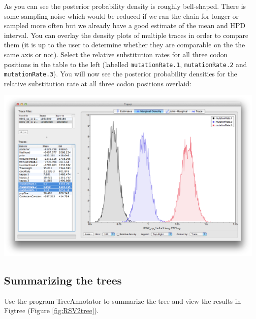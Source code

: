 \documentclass[12pt]{article}
\begin{document}
\medskip{}

As you can see the posterior probability density is roughly bell-shaped. There is some sampling noise which would be
reduced if we ran the chain for longer or sampled more often but we already have a good estimate of the mean and HPD interval. You can overlay
the density plots of multiple traces in order to compare them (it is up to the user to determine whether they are comparable on the the same axis or not). Select the relative substitution rates for all three codon positions in the table to the left (labelled
\texttt{mutationRate.1}, \texttt{mutationRate.2} and \texttt{mutationRate.3}). You will now see the posterior probability densities for the relative
substitution rate at all three codon positions overlaid:

\medskip{}

\includegraphics[width=\textwidth]{figures/Tracer_relativeRates}

\subsection*{Summarizing the trees}

Use the program TreeAnnotator to summarize the tree and view the results in Figtree (Figure \ref{fig:RSV2tree}).
\end{document}
